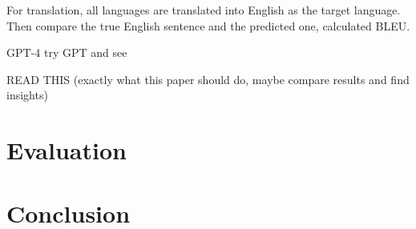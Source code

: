 \documentclass[a4paper]{article}
\begin{document}
For translation, all languages are translated into English as the target language. Then compare the true English sentence and the predicted one, calculated BLEU.

GPT-4 \cite{openai-2024-gpt4} try GPT and see

READ THIS \cite{intento-2020} (exactly what this paper should do, maybe compare results and find insights)

\section{Evaluation}

\section{Conclusion}

\printbibliography
\end{document}

